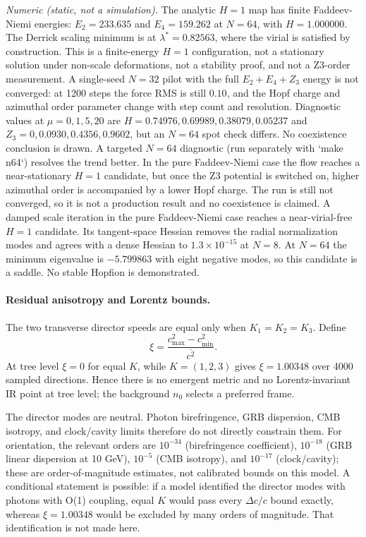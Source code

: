 \documentclass[11pt]{article}
\begin{document}
\emph{Numeric (static, not a simulation).} The analytic $H=1$ map has finite
Faddeev-Niemi energies: $E_2=233.635$ and $E_4=159.262$ at $N=64$, with
$H=1.000000$. The Derrick scaling minimum is at $\lambda^*=0.82563$, where the
virial is satisfied by construction. This is a finite-energy $H=1$
configuration, not a stationary solution under non-scale deformations, not a
stability proof, and not a Z3-order measurement. A single-seed $N=32$ pilot
with the full $E_2+E_4+Z_3$ energy is not converged: at 1200 steps the force
RMS is still $0.10$, and the Hopf charge and azimuthal order parameter change
with step count and resolution. Diagnostic values at $\mu=0,1,5,20$ are
$H=0.74976,0.69989,0.38079,0.05237$ and
$Z_3=0,0.0930,0.4356,0.9602$, but an $N=64$ spot check differs. No coexistence
conclusion is drawn. A targeted $N=64$ diagnostic (run separately with `make n64`)
resolves the trend better. In the pure Faddeev-Niemi case the flow reaches a
near-stationary $H=1$ candidate, but once the Z3 potential is switched on,
higher azimuthal order is accompanied by a lower Hopf charge. The run is still
not converged, so it is not a production result and no coexistence is claimed.
A damped scale iteration in the pure Faddeev-Niemi case reaches a near-virial-free
$H=1$ candidate. Its tangent-space Hessian removes the radial normalization
modes and agrees with a dense Hessian to $1.3\times10^{-15}$ at $N=8$. At
$N=64$ the minimum eigenvalue is $-5.799863$ with eight negative modes, so this
candidate is a saddle. No stable Hopfion is demonstrated.

\paragraph{Residual anisotropy and Lorentz bounds.} The two transverse
director speeds are equal only when $K_1=K_2=K_3$. Define
\begin{equation}
\xi=\frac{c_{\max}^2-c_{\min}^2}{\overline{c^2}}.
\end{equation}
At tree level $\xi=0$ for equal $K$, while $K=(1,2,3)$ gives $\xi=1.00348$ over
4000 sampled directions. Hence there is no emergent metric and no
Lorentz-invariant IR point at tree level; the background $n_0$ selects a
preferred frame.

The director modes are neutral. Photon birefringence, GRB dispersion, CMB
isotropy, and clock/cavity limits therefore do not directly constrain them.
For orientation, the relevant orders are $10^{-34}$ (birefringence
coefficient), $10^{-18}$ (GRB linear dispersion at 10 GeV), $10^{-5}$ (CMB
isotropy), and $10^{-17}$ (clock/cavity); these are order-of-magnitude
estimates, not calibrated bounds on this model. A conditional statement is
possible: if a model identified the director modes with photons with O(1)
coupling, equal $K$ would pass every $\Delta c/c$ bound exactly, whereas
$\xi=1.00348$ would be excluded by many orders of magnitude. That identification
is not made here.
\end{document}
